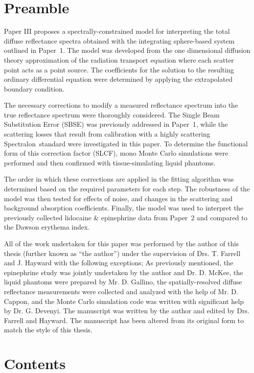 \label{chap:p3-model}
\section*{Preamble}
Paper III proposes a spectrally-constrained model for interpreting the total diffuse reflectance spectra obtained with the integrating sphere-based system outlined in Paper~1. The model was developed from the one dimensional diffusion theory approximation of the radiation transport equation\cite{Farrell1992} where each scatter point acts as a point source. The coefficients for the solution to the resulting ordinary differential equation were determined by applying the extrapolated boundary condition.

The necessary corrections to modify a measured reflectance spectrum into the true reflectance spectrum were thoroughly considered. The Single Beam Substitution Error (SBSE) was previously addressed in Paper~1, while the scattering losses that result from calibration with a highly scattering Spectralon\textregistered~standard were investigated in this paper. To determine the functional form of this correction factor (SLCF), mono Monte Carlo simulations were performed and then confirmed with tissue-simulating liquid phantoms.

The order in which these corrections are applied in the fitting algorithm was determined based on the required parameters for each step. The robustness of the model was then tested for effects of noise, and changes in the scattering and background absorption coefficients. Finally, the model was used to interpret the previously collected lidocaine \& epinephrine data from Paper~2 and compared to the Dawson erythema index.\cite{Dawson1980}

All of the work undertaken for this paper was performed by the author of this thesis (further known as ``the author'') under the supervision of Drs. T. Farrell and J. Hayward with the following exceptions; As previously mentioned, the epinephrine study was jointly undertaken by the author and Dr. D. McKee, the liquid phantoms were prepared by Mr. D. Gallino, the spatially-resolved diffuse reflectance measurements were collected and analyzed with the help of Mr. D. Cappon, and the Monte Carlo simulation code was written with significant help by Dr. G. Devenyi. The manuscript was written by the author and edited by Drs. Farrell and Hayward. The manuscript has been altered from its original form to match the style of this thesis.

\section*{Contents}

